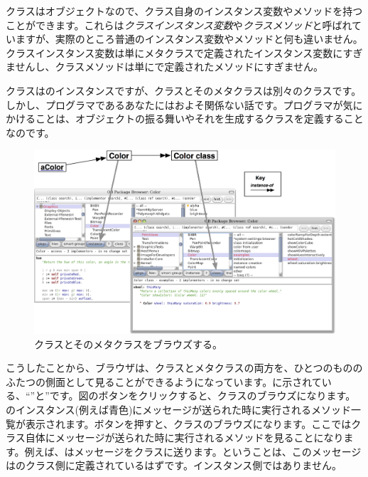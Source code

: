 \documentclass[a4paper,10pt,twoside]{book}
\begin{document}
クラスはオブジェクトなので、クラス自身のインスタンス変数やメソッドを持つことができます。これらは\emph{クラスインスタンス変数}や\emph{クラスメソッド}と呼ばれていますが、実際のところ普通のインスタンス変数やメソッドと何も違いません。クラスインスタンス変数は単にメタクラスで定義されたインスタンス変数にすぎませんし、クラスメソッドは単にで定義されたメソッドにすぎません。

クラスはのインスタンスですが、クラスとそのメタクラスは別々のクラスです。しかし、プログラマであるあなたにはおよそ関係ない話です。プログラマが気にかけることは、オブジェクトの振る舞いやそれを生成するクラスを定義することなのです。

\begin{figure}[htb]
\begin{center}
\includegraphics[width=\textwidth]{Color-Buttons}
\caption{クラスとそのメタクラスをブラウズする。
}
\end{center}
\end{figure}

こうしたことから、ブラウザは、クラスとメタクラスの両方を、ひとつのもののふたつの側面として見ることができるようになっています。に示されている、``''と''です。図のボタンをクリックすると、クラスのブラウズになります。のインスタンス(例えば青色)にメッセージが送られた時に実行されるメソッド一覧が表示されます。ボタンを押すと、クラスのブラウズになります。ここではクラス自体にメッセージが送られた時に実行されるメソッドを見ることになります。例えば、はメッセージをクラスに送ります。ということは、このメッセージはのクラス側に定義されているはずです。インスタンス側ではありません。
\end{document}
